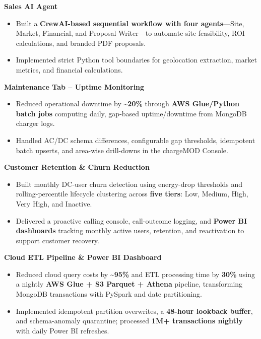 \documentclass[11pt,letterpaper]{article}
\newcommand{\project}[1]{%
    \vspace{2pt}\noindent\textbf{#1}\par\nobreak
}
\newcommand{\about}{\textasciitilde{}}
\begin{document}
\pagebreak

\project{Sales AI Agent}
\begin{itemize}
    \item Built a \textbf{CrewAI-based sequential workflow with four agents}---Site, Market, Financial, and Proposal Writer---to automate site feasibility, ROI calculations, and branded PDF proposals.
    \item Implemented strict Python tool boundaries for geolocation extraction, market metrics, and financial calculations.
\end{itemize}

\project{Maintenance Tab -- Uptime Monitoring}
\begin{itemize}
    \item Reduced operational downtime by \textbf{\about20\%} through \textbf{AWS Glue/Python batch jobs} computing daily, gap-based uptime/downtime from MongoDB charger logs.
    \item Handled AC/DC schema differences, configurable gap thresholds, idempotent batch upserts, and area-wise drill-downs in the chargeMOD Console.
\end{itemize}

\project{Customer Retention \& Churn Reduction}
\begin{itemize}
    \item Built monthly DC-user churn detection using energy-drop thresholds and rolling-percentile lifecycle clustering across \textbf{five tiers}: Low, Medium, High, Very High, and Inactive.
    \item Delivered a proactive calling console, call-outcome logging, and \textbf{Power BI dashboards} tracking monthly active users, retention, and reactivation to support customer recovery.
\end{itemize}

\project{Cloud ETL Pipeline \& Power BI Dashboard}
\begin{itemize}
    \item Reduced cloud query costs by \textbf{\about95\%} and ETL processing time by \textbf{30\%} using a nightly \textbf{AWS Glue + S3 Parquet + Athena} pipeline, transforming MongoDB transactions with PySpark and date partitioning.
    \item Implemented idempotent partition overwrites, a \textbf{48-hour lookback buffer}, and schema-anomaly quarantine; processed \textbf{1M+ transactions nightly} with daily Power BI refreshes.
\end{itemize}
\end{document}

